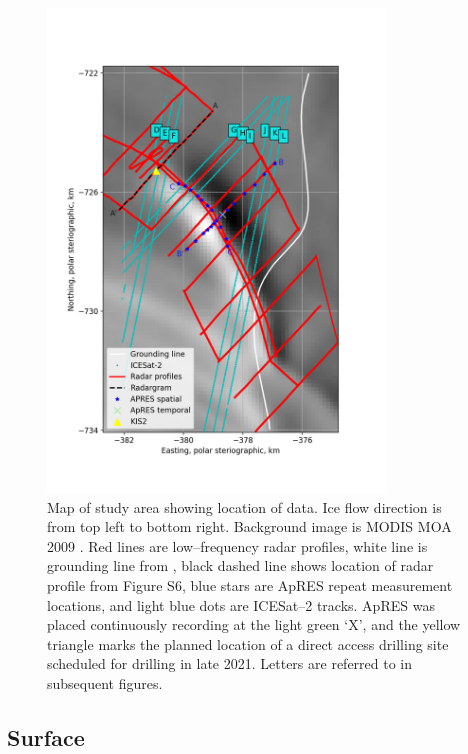 \begin{figure}[!ht]
\centering
\includegraphics[width=0.8\textwidth]{chapters/2/geophysics_overview.png}
\caption[Map of field data]{Map of study area showing location of data. Ice flow direction is from top left to bottom right. Background image is MODIS MOA 2009 \citep{haran2014modis}. Red lines are low--frequency radar profiles, white line is grounding line from \cite{depoorter2013amii}, black dashed line shows location of radar profile from Figure S6, blue stars are ApRES repeat measurement locations, and light blue dots are ICESat--2 tracks.  ApRES was placed continuously recording at the light green `X', and the yellow triangle marks the planned location of a direct access drilling site scheduled for drilling in late 2021. Letters are referred to in subsequent figures.}
\label{fig:geophysics_overview}
\end{figure}


\subsection{Surface} \label{sec:surface}

